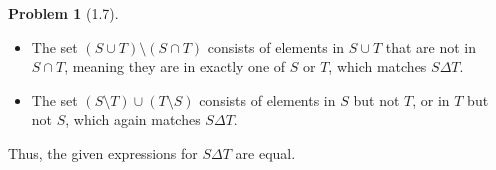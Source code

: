 \documentclass[12pt]{article}
\theoremstyle{definition}
\newtheorem{problem}{Problem}
\begin{document}
\begin{problem}[1.7]
\begin{enumerate}[label=(\alph*)]
\begin{solution}
\begin{itemize}
                \item The set \( (S \cup T) \setminus (S \cap T) \) consists of elements in \( S \cup T \) that are not in \( S \cap T \), meaning they are in exactly one of \( S \) or \( T \), which matches \( S \Delta T \).
                \item The set \( (S \setminus T) \cup (T \setminus S) \) consists of elements in \( S \) but not \( T \), or in \( T \) but not \( S \), which again matches \( S \Delta T \).
            \end{itemize}
            Thus, the given expressions for \( S \Delta T \) are equal.

        \end{solution}
    \end{enumerate}
\end{problem}
\end{document}
